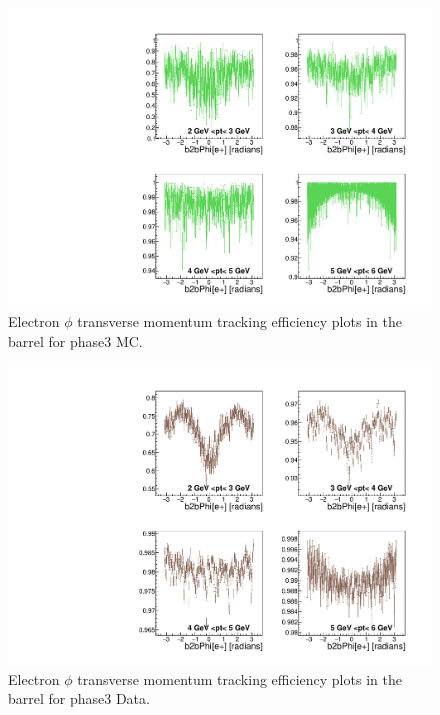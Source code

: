\documentclass[a4paper,11pt,twosided,final,german,openbib,pdftex,listof=totoc,bibliography=totoc]{scrbook}
\begin{document}
\begin{appendix}
\clearpage





\begin{figure}[!htbp]
	\centering
	\includegraphics[width=\textwidth]{Plots/master3/xPtMPhiemBarrel_MCP3}
	\caption[Transverse Momentum $\phi$ Electron Barrel Efficiency Phase3 MC]{Electron $\phi$ transverse momentum tracking efficiency plots in the barrel for phase3 MC.}
	\label{plt:PtMPhiemBarrel3_MC}
\end{figure}


\begin{figure}[!htbp]
	\centering
	\includegraphics[width=\textwidth]{Plots/master3/xPtMPhiemBarrel_DataP3}
	\caption[Transverse Momentum $\phi$ Electron Barrel Efficiency Phase3 Data]{Electron $\phi$ transverse momentum tracking efficiency plots in the barrel for phase3 Data.}
	\label{plt:PtMPhiemBarrel3_Data}
\end{figure}







\end{appendix}
\end{document}
